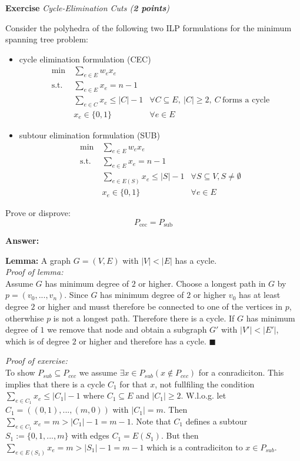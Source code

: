 \documentclass[a4paper,10pt]{article}
\newcounter{exc}
\newenvironment{exercise}[1]%
{\refstepcounter{exc}\textbf{Exercise \arabic{exc}} \emph{#1}\\}
{

\hrulefill\medskip}%
\begin{document}
\newpage

\begin{exercise}{Cycle-Elimination Cuts (\textbf{2 points})}\label{ex:cec}

Consider the polyhedra of the following two ILP formulations for the minimum spanning tree problem:

\begin{itemize}
\item cycle elimination formulation (CEC)
\begin{align}
	\min\ & \sum_{e \in E} w_e x_e \\
	\text{s.t.} & \sum_{e \in E} x_e = n-1 \\
		& \sum_{e \in C} x_e \leq |C|-1 & \forall C \subseteq E,\ |C|\ge 2,\ C~\mbox{forms a cycle} \\
		& x_e \in \{0, 1\} & \forall e \in E
\end{align}

\item subtour elimination formulation (SUB)
\begin{align}
	\min\ & \sum_{e \in E} w_e x_e \\
	\text{s.t.} & \sum_{e \in E} x_e = n-1 \\
		& \sum_{e \in E(S)} x_e \leq |S|-1 & \forall S \subseteq V, S \neq \emptyset \\
		& x_e \in \{0, 1\} & \forall e \in E
\end{align}
\end{itemize}
Prove or disprove:
\[ P_\mathrm{cec} = P_\mathrm{sub} \]

\textbf{Answer:}


\textbf{Lemma:}
  A graph $G=(V,E)$ with $|V|<|E|$ has a cycle.\\
\emph{Proof of lemma:}\\
%
  Assume $G$ has minimum degree of $2$ or higher. Choose a longest path in $G$ by $p=(v_0,...,v_n)$. Since $G$ has minimum degree of $2$ or higher $v_0$ has at least degree $2$ or higher and musst therefore be connected to one of the vertices in $p$, otherwhise $p$ is not a longest path. Therefore there is a cycle. If $G$ has minimum degree of $1$ we remove that node and obtain a subgraph $G'$ with $|V'|<|E'|$, which is of degree $2$ or higher and therefore has a cycle. $\blacksquare$


\emph{Proof of exercise:}\\
%
  To show $P_{sub}\subseteq P_{cec}$ we assume $\exists x\in P_{sub}(x\not\in P_{cec})$ for a conradiciton. This implies that there is a cycle $C_1$ for that $x$, not fullfiling the condition $\sum \limits_{e\in C_1} x_e\leq |C_1|-1$ where $C_1\subseteq E$ and $|C_1|\geq 2$. W.l.o.g. let $C_1 =((0,1), ..., (m,0))$ with $|C_1|=m$. Then $\sum\limits_{e\in C_1}x_e =m> |C_1|-1=m-1$. Note that $C_1$ defines a subtour $S_1:=\{ 0,1,...,m\}$ with edges $C_1=E(S_1)$. But then $\sum\limits_{e\in E(S_1)} x_e = m > |S_1| -1 = m-1$ which is a contradiciton to $x\in P_{sub}$.


\end{exercise}
\end{document}
